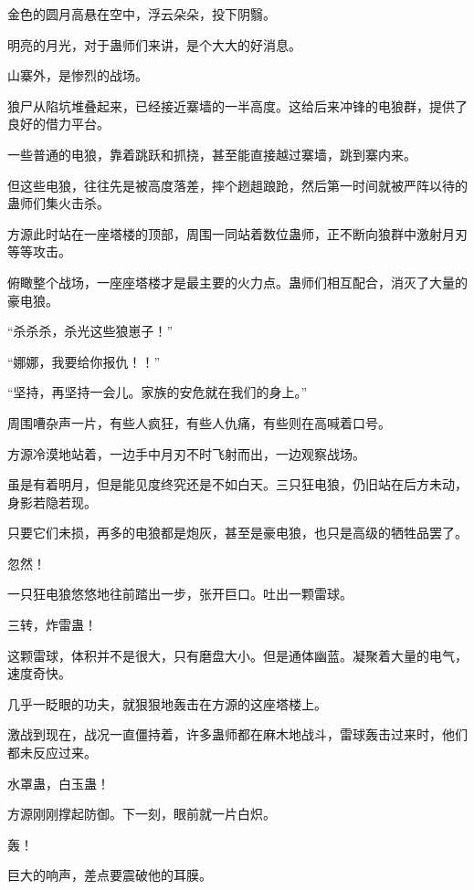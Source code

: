 
\begin{this_body}



金色的圆月高悬在空中，浮云朵朵，投下阴翳。

明亮的月光，对于蛊师们来讲，是个大大的好消息。

山寨外，是惨烈的战场。

狼尸从陷坑堆叠起来，已经接近寨墙的一半高度。这给后来冲锋的电狼群，提供了良好的借力平台。

一些普通的电狼，靠着跳跃和抓挠，甚至能直接越过寨墙，跳到寨内来。

但这些电狼，往往先是被高度落差，摔个趔趄踉跄，然后第一时间就被严阵以待的蛊师们集火击杀。

方源此时站在一座塔楼的顶部，周围一同站着数位蛊师，正不断向狼群中激射月刃等等攻击。

俯瞰整个战场，一座座塔楼才是最主要的火力点。蛊师们相互配合，消灭了大量的豪电狼。

“杀杀杀，杀光这些狼崽子！”

“娜娜，我要给你报仇！！”

“坚持，再坚持一会儿。家族的安危就在我们的身上。”

周围嘈杂声一片，有些人疯狂，有些人仇痛，有些则在高喊着口号。

方源冷漠地站着，一边手中月刃不时飞射而出，一边观察战场。

虽是有着明月，但是能见度终究还是不如白天。三只狂电狼，仍旧站在后方未动，身影若隐若现。

只要它们未损，再多的电狼都是炮灰，甚至是豪电狼，也只是高级的牺牲品罢了。

忽然！

一只狂电狼悠悠地往前踏出一步，张开巨口。吐出一颗雷球。

三转，炸雷蛊！

这颗雷球，体积并不是很大，只有磨盘大小。但是通体幽蓝。凝聚着大量的电气，速度奇快。

几乎一眨眼的功夫，就狠狠地轰击在方源的这座塔楼上。

激战到现在，战况一直僵持着，许多蛊师都在麻木地战斗，雷球轰击过来时，他们都未反应过来。

水罩蛊，白玉蛊！

方源刚刚撑起防御。下一刻，眼前就一片白炽。

轰！

巨大的响声，差点要震破他的耳膜。


\end{this_body}
